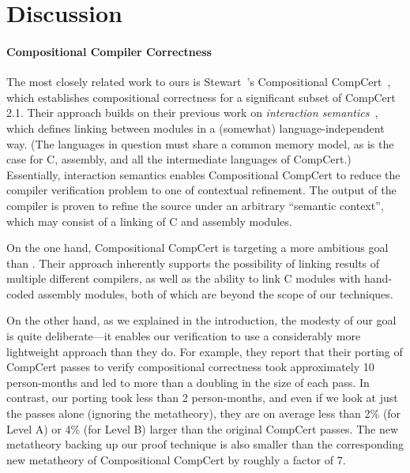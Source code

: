 \section{Discussion}
\label{sec:sepcomp:discussion}





\paragraph{Compositional Compiler Correctness}

The most closely related work to ours is Stewart~\etal's Compositional
CompCert~\cite{stewart+:popl2015}, which establishes compositional correctness for a
significant subset of CompCert 2.1.  Their approach builds on their
previous work on \emph{interaction semantics}~\cite{beringer+:esop14}, which defines
linking between modules in a (somewhat) language-independent way.
(The languages in question must share a common memory model, as is the
case for C, assembly, and all the intermediate languages of CompCert.)
Essentially, interaction semantics enables Compositional CompCert to
reduce the compiler verification problem to one of contextual
refinement.  The output of the compiler is proven to refine the source
under an arbitrary ``semantic context'', which may consist of a
linking of C and assembly modules.

On the one hand, Compositional CompCert is targeting a more ambitious
goal than \sepcomp{}.  Their approach inherently supports the
possibility of linking results of multiple different compilers, as
well as the ability to link C modules with hand-coded assembly
modules, both of which are beyond the scope of our techniques.

On the other hand, as we explained in the introduction, the modesty of
our goal is quite deliberate---it enables our \sepcomp{} verification
to use a considerably more lightweight approach than they do.  For
example, they report that their porting of CompCert passes to verify
compositional correctness took approximately 10 person-months and led
to more than a doubling in the size of each pass.  In contrast, our
porting took less than 2 person-months, and even if we look at just
the passes alone (ignoring the metatheory), they are on average less
than 2\% (for Level A) or 4\% (for Level B) larger than the original
CompCert passes.  The new metatheory backing up our proof technique is
also smaller than the corresponding new metatheory of Compositional
CompCert by roughly a factor of 7.

